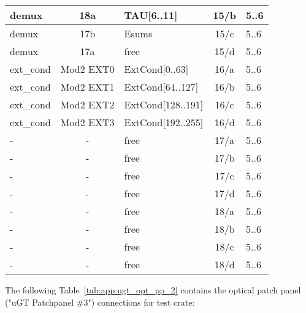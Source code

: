 \begin{longtable}{|l|c|l|c|l|}
demux & 18a & TAU[6..11] & 15/b & 5..6 \\\hline
demux & 17b & Esums      & 15/c & 5..6 \\\hline
demux & 17a & free       & 15/d & 5..6 \\\hline
ext\_cond & Mod2 EXT0 & ExtCond[0..63]    & 16/a & 5..6 \\\hline
ext\_cond & Mod2 EXT1 & ExtCond[64..127]  & 16/b & 5..6 \\\hline
ext\_cond & Mod2 EXT2 & ExtCond[128..191] & 16/c & 5..6 \\\hline
ext\_cond & Mod2 EXT3 & ExtCond[192..255] & 16/d & 5..6 \\\hline
- & - & free & 17/a & 5..6 \\\hline
- & - & free & 17/b & 5..6 \\\hline
- & - & free & 17/c & 5..6 \\\hline
- & - & free & 17/d & 5..6 \\\hline
- & - & free & 18/a & 5..6 \\\hline
- & - & free & 18/b & 5..6 \\\hline
- & - & free & 18/c & 5..6 \\\hline
- & - & free & 18/d & 5..6 \\\hline
\end{longtable}

The following Table~\ref{tab:app:ugt_opt_pp_2} contains the optical patch panel ("uGT Patchpanel \#3") connections for test crate:

